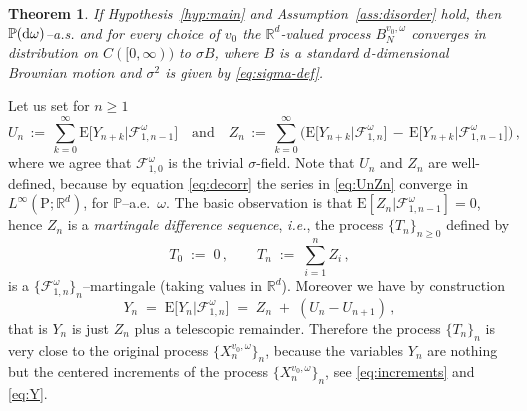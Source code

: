 \documentclass[a4paper,reqno,11pt]{amsart}
\numberwithin{equation}{section}
\newtheorem{theorem}{Theorem}[section]
\newcommand{\bbP}{{\ensuremath{\mathbb P}} }
\newcommand{\cF}{{\ensuremath{\mathcal F}} }
\newcommand{\gs}{\sigma}
\newcommand{\go}{\omega}
\newcommand{\dd}{\text{\rm d}}             %
\newcommand{\R}{\mathbb{R}}
\def\bP{\ensuremath{\bs{\mathrm{P}}}}
\def\bE{\ensuremath{\bs{\mathrm{E}}}}
\def\bs{\boldsymbol}
\begin{document}
\medskip
\begin{theorem}
\label{th:inv-princ}
If Hypothesis~\ref{hyp:main} and Assumption~\ref{ass:disorder} hold,
then $\bbP(\dd \go)$--a.s. and for every choice of $v_0$
the $\R^d$-valued process $B^{v_0,\omega}_{N}$ 
converges in distribution on $C([0, \infty))$ to $\gs B$, 
where $B$ is a standard $d$-dimensional Brownian motion
and $\gs^2$ is given by \eqref{eq:sigma-def}.
\end{theorem}

\smallskip


Let us set for $n \ge 1$
\begin{equation} \label{eq:UnZn}
U_n \,:=\, \sum_{k=0}^\infty \bE \big[ Y_{n+k}  \big| \cF_{1,n-1}^\go \big]
\quad \text{and} \quad
Z_n \,:=\, \sum_{k=0}^\infty \big( \bE \big[ Y_{n+k} \big| \cF_{1,n}^\go \big] 
\,-\, \bE\big[Y_{n+k} \big| \cF_{1,n-1}^\go\big] \big)\,,
\end{equation}
where we agree that $\cF_{1,0}^\go$ is the trivial $\gs$-field.
Note that $U_n$ and $Z_n$ are well-defined, because by equation \eqref{eq:decorr}
the series in \eqref{eq:UnZn} converge in $L^\infty(\bP;\R^d)$,
for $\bbP$--a.e.~$\go$.
The basic observation is that $\bE[Z_n|\cF_{1,n-1}^\go] = 0$,
hence $Z_n$ is a {\sl martingale difference sequence}, {\sl i.e.},
the process $\{T_n\}_{n \ge 0}$ defined by
\begin{equation} \label{eq:Tn}
	T_0 \;:=\; 0 \,, \qquad T_n \;:=\; \sum_{i=1}^n Z_i\,,
\end{equation}
is a $\{\cF^\go_{1,n}\}_n$--martingale (taking values in $\R^d$).
Moreover we have by construction
\begin{equation} \label{eq:telescopic}
Y_n  \;=\; \bE \big[ Y_n \big| \cF_{1,n}^\go \big] \;=\; Z_n \;+\;
(U_n - U_{n+1})\,,
\end{equation}
that is $Y_n$ is just $Z_n$ plus a telescopic remainder.
Therefore the process $\{T_n\}_n$ is very close to the original process $\{X^{v_0,\go}_n\}_n$,
because the variables $Y_n$ are nothing but the centered increments of the process
$\{X^{v_0, \go}_n\}_n$, see \eqref{eq:increments} and \eqref{eq:Y}.
\end{document}
